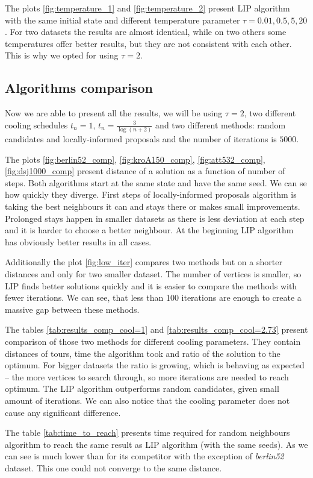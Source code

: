 	
	
	The plots \ref{fig:temperature_1} and \ref{fig:temperature_2} present LIP algorithm with the same initial state and different temperature parameter $\tau=0.01, 0.5, 5, 20$. For two datasets the results are almost identical, while on two others some temperatures offer better results, but they are not consistent with each other. This is why we opted for using $\tau=2$.
	
\subsection{Algorithms comparison}
	Now we are able to present all the results, we will be using $\tau=2$, two different cooling schedules $t_n=1, \, t_n=\frac{3}{\log(n+2)}$ and two different methods: random candidates and locally-informed proposals and the number of iterations is $5000$.
	
	
	
	The plots \ref{fig:berlin52_comp}, \ref{fig:kroA150_comp}, \ref{fig:att532_comp}, \ref{fig:dsj1000_comp} present distance of a solution as a function of number of steps. Both algorithms start at the same state and have the same seed. We can se how quickly they diverge. First steps of locally-informed proposals algorithm is taking the best neighbours it can and stays there or makes small improvements. Prolonged stays happen in smaller datasets as there is less deviation at each step and it is harder to choose a better neighbour. At the beginning LIP algorithm has obviously better results in all cases.
	
	Additionally the plot \ref{fig:low_iter} compares two methods but on a shorter distances and only for two smaller dataset. The number of vertices is smaller, so LIP finds better solutions quickly and it is easier to compare the methods with fewer iterations. We can see, that less than 100 iterations are enough to create a massive gap between these methods.
	
	
	
	The tables \ref{tab:results_comp_cool=1} and \ref{tab:results_comp_cool=2.73} present comparison of those two methods for different cooling parameters. They contain distances of tours, time the algorithm took and ratio of the solution to the optimum. For bigger datasets the ratio is growing, which is behaving as expected -- the more vertices to search through, so more iterations are needed to reach optimum. The LIP algorithm outperforms random candidates, given small amount of iterations. We can also notice that the cooling parameter does not cause any significant difference.
	
	
	
	The table \ref{tab:time_to_reach} presents time required for random neighbours algorithm to reach the same result as LIP algorithm (with the same seeds). As we can see is much lower than for its competitor with the exception of \textit{berlin52} dataset. This one could not converge to the same distance.